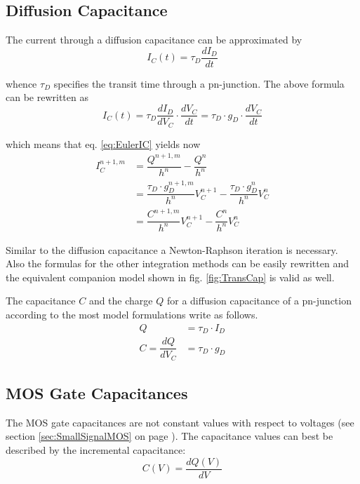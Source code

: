 \subsection{Diffusion Capacitance}

The current through a diffusion capacitance can be approximated by
\begin{equation}
I_C(t) = \tau_D \dfrac{d I_D}{d t}
\end{equation}

whence $\tau_D$ specifies the transit time through a pn-junction.  The
above formula can be rewritten as
\begin{equation}
I_C(t) = \tau_D \dfrac{d I_D}{d V_C}\cdot \dfrac{d V_C}{d t} = \tau_D \cdot g_D \cdot \dfrac{d V_C}{d t}
\end{equation}

which means that eq. \eqref{eq:EulerIC} yields now
\begin{equation}
\begin{split}
I_C^{n+1,m} &= \dfrac{Q^{n+1,m}}{h^{n}} - \dfrac{Q^{n}}{h^{n}}\\
&= \dfrac{\tau_D\cdot g_D^{n+1,m}}{h^{n}} V_C^{n+1} - \dfrac{\tau_D\cdot g_D^{n}}{h^{n}} V_C^{n}\\
&= \dfrac{C^{n+1,m}}{h^{n}} V_C^{n+1} - \dfrac{C^{n}}{h^{n}} V_C^{n}
\end{split}
\end{equation}

Similar to the diffusion capacitance a Newton-Raphson iteration is
necessary.  Also the formulas for the other integration methods can be
easily rewritten and the equivalent companion model shown in
fig. \ref{fig:TransCap} is valid as well.

\addvspace{12pt}

The capacitance $C$ and the charge $Q$ for a diffusion capacitance of
a pn-junction according to the most model formulations write as
follows.
\begin{align}
Q &= \tau_D\cdot I_D\\
C = \dfrac{d Q}{d V_C} &= \tau_D\cdot g_D
\end{align}

\subsection{MOS Gate Capacitances}

The MOS gate capacitances are not constant values with respect to
voltages (see section \ref{sec:SmallSignalMOS} on page
\pageref{sec:SmallSignalMOS}). The capacitance values can best be
described by the incremental capacitance:
\begin{equation}
C(V) = \dfrac{d Q(V)}{d V}
\end{equation}

